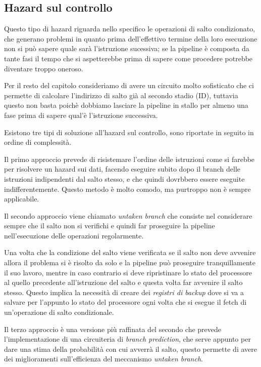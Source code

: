 \documentclass[class=book, crop=false, oneside]{standalone}
\begin{document}
\subsection{Hazard sul controllo}
Questo tipo di hazard riguarda nello specifico le operazioni di salto condizionato, che generano problemi in quanto prima dell'effettivo termine della loro esecuzione non si può sapere quale sarà l'istruzione sucessiva; se la pipeline è composta da tante fasi il tempo che si aspetterebbe prima di sapere come procedere potrebbe diventare troppo oneroso.

Per il resto del capitolo consideriamo di avere un circuito molto sofisticato che ci permette di calcolare l’indirizzo di salto già al secondo stadio (ID), tuttavia questo non basta poichè dobbiamo lasciare la pipeline in stallo per almeno una fase prima di sapere qual'è l'istruzione successiva.

Esistono tre tipi di soluzione all'hazard sul controllo, sono riportate in seguito in ordine di complessità.

Il primo approccio prevede di risistemare l'ordine delle istruzioni come si farebbe per risolvere un hazard sui dati, facendo eseguire subito dopo il branch delle istruzioni indipendenti dal salto stesso, e che quindi dovrbbero essere eseguite indifferentemente.
Questo metodo è molto comodo, ma purtroppo non è sempre applicabile.

Il secondo approccio viene chiamato \emph{untaken branch} che consiste nel considerare sempre che il salto non si verifichi e quindi far proseguire la pipeline nell'esecuzione delle operazioni regolarmente.

Una volta che la condizione del salto viene verificata se il salto non deve avvenire allora il problema si è risolto da solo e la pipeline può proseguire tranquillamente il suo lavoro, mentre in caso contrario si deve ripristinare lo stato del processore al quello precedente all'istruzione del salto e  questa volta far avvenire il salto stesso.
Questo implica la necessità di creare dei \emph{registri di backup} dove si va a salvare per l'appunto lo stato del processore ogni volta che si esegue il fetch di un'operazione di salto condizionale.

Il terzo approccio è una versione più raffinata del secondo che prevede l'implementazione di una circuiteria di \emph{branch prediction}, che serve appunto per dare una stima della probabilità con cui avverrà il salto, questo permette di avere dei miglioramenti sull'efficienza del meccanismo \emph{untaken branch}.
\end{document}
